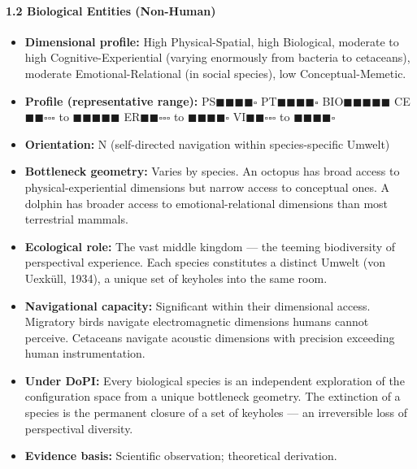 \paragraph*{1.2 Biological Entities (Non-Human)}

\begin{itemize}[nosep,leftmargin=*]
  \item \textbf{Dimensional profile:} High Physical-Spatial, high Biological, moderate to high Cognitive-Experiential (varying enormously from bacteria to cetaceans), moderate Emotional-Relational (in social species), low Conceptual-Memetic.
  \item \textbf{Profile (representative range):} PS$\blacksquare$$\blacksquare$$\blacksquare$$\blacksquare$$\square$ PT$\blacksquare$$\blacksquare$$\blacksquare$$\blacksquare$$\square$ BIO$\blacksquare$$\blacksquare$$\blacksquare$$\blacksquare$$\blacksquare$ CE$\blacksquare$$\blacksquare$$\square$$\square$$\square$ to $\blacksquare$$\blacksquare$$\blacksquare$$\blacksquare$$\blacksquare$ ER$\blacksquare$$\blacksquare$$\square$$\square$$\square$ to $\blacksquare$$\blacksquare$$\blacksquare$$\blacksquare$$\square$ VI$\blacksquare$$\blacksquare$$\square$$\square$$\square$ to $\blacksquare$$\blacksquare$$\blacksquare$$\blacksquare$$\square$
  \item \textbf{Orientation:} N (self-directed navigation within species-specific Umwelt)
  \item \textbf{Bottleneck geometry:} Varies by species. An octopus has broad access to physical-experiential dimensions but narrow access to conceptual ones. A dolphin has broader access to emotional-relational dimensions than most terrestrial mammals.
  \item \textbf{Ecological role:} The vast middle kingdom — the teeming biodiversity of perspectival experience. Each species constitutes a distinct Umwelt (von Uexküll, 1934), a unique set of keyholes into the same room.
  \item \textbf{Navigational capacity:} Significant within their dimensional access. Migratory birds navigate electromagnetic dimensions humans cannot perceive. Cetaceans navigate acoustic dimensions with precision exceeding human instrumentation.
  \item \textbf{Under DoPI:} Every biological species is an independent exploration of the configuration space from a unique bottleneck geometry. The extinction of a species is the permanent closure of a set of keyholes — an irreversible loss of perspectival diversity.
  \item \textbf{Evidence basis:} Scientific observation; theoretical derivation.
\end{itemize}


